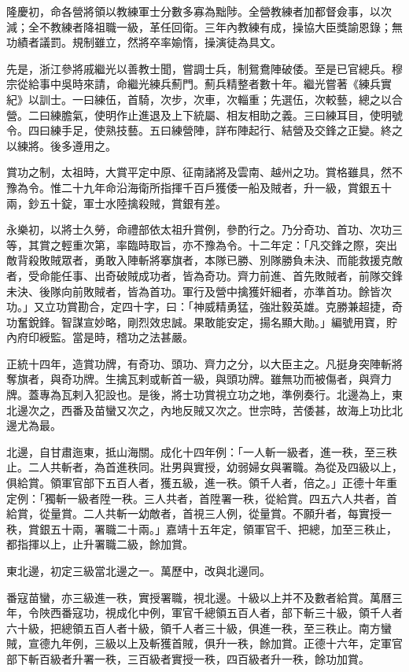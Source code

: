 隆慶初，命各營將領以教練軍士分數多寡為黜陟。全營教練者加都督僉事，以次減；全不教練者降祖職一級，革任回衛。三年內教練有成，操協大臣獎諭恩錄；無功績者議罰。規制雖立，然將卒率媮惰，操演徒為具文。

先是，浙江參將戚繼光以善教士聞，嘗調士兵，制鴛鴦陣破倭。至是已官總兵。穆宗從給事中吳時來請，命繼光練兵薊門。薊兵精整者數十年。繼光嘗著《練兵實紀》以訓士。一曰練伍，首騎，次步，次車，次輜重；先選伍，次較藝，總之以合營。二曰練膽氣，使明作止進退及上下統屬、相友相助之義。三曰練耳目，使明號令。四曰練手足，使熟技藝。五曰練營陣，詳布陣起行、結營及交鋒之正變。終之以練將。後多遵用之。

賞功之制，太祖時，大賞平定中原、征南諸將及雲南、越州之功。賞格雖具，然不豫為令。惟二十九年命沿海衛所指揮千百戶獲倭一船及賊者，升一級，賞銀五十兩，鈔五十錠，軍士水陸擒殺賊，賞銀有差。

永樂初，以將士久勞，命禮部依太祖升賞例，參酌行之。乃分奇功、首功、次功三等，其賞之輕重次第，率臨時取旨，亦不豫為令。十二年定：「凡交鋒之際，突出敵背殺敗賊眾者，勇敢入陣斬將搴旗者，本隊已勝、別隊勝負未決、而能救援克敵者，受命能任事、出奇破賊成功者，皆為奇功。齊力前進、首先敗賊者，前隊交鋒未決、後隊向前敗賊者，皆為首功。軍行及營中擒獲奸細者，亦準首功。餘皆次功。」又立功賞勘合，定四十字，曰：「神威精勇猛，強壯毅英雄。克勝兼超捷，奇功奮銳鋒。智謀宣妙略，剛烈效忠誠。果敢能安定，揚名顯大勛。」編號用寶，貯內府印綬監。當是時，稽功之法甚嚴。

正統十四年，造賞功牌，有奇功、頭功、齊力之分，以大臣主之。凡挺身突陣斬將奪旗者，與奇功牌。生擒瓦剌或斬首一級，與頭功牌。雖無功而被傷者，與齊力牌。蓋專為瓦剌入犯設也。是後，將士功賞視立功之地，準例奏行。北邊為上，東北邊次之，西番及苗蠻又次之，內地反賊又次之。世宗時，苦倭甚，故海上功比北邊尤為最。

北邊，自甘肅迤東，抵山海關。成化十四年例：「一人斬一級者，進一秩，至三秩止。二人共斬者，為首進秩同。壯男與實授，幼弱婦女與署職。為從及四級以上，俱給賞。領軍官部下五百人者，獲五級，進一秩。領千人者，倍之。」正德十年重定例：「獨斬一級者陞一秩。三人共者，首陞署一秩，從給賞。四五六人共者，首給賞，從量賞。二人共斬一幼敵者，首視三人例，從量賞。不願升者，每實授一秩，賞銀五十兩，署職二十兩。」嘉靖十五年定，領軍官千、把總，加至三秩止，都指揮以上，止升署職二級，餘加賞。

東北邊，初定三級當北邊之一。萬歷中，改與北邊同。

番寇苗蠻，亦三級進一秩，實授署職，視北邊。十級以上并不及數者給賞。萬曆三年，令陜西番寇功，視成化中例，軍官千總領五百人者，部下斬三十級，領千人者六十級，把總領五百人者十級，領千人者三十級，俱進一秩，至三秩止。南方蠻賊，宣德九年例，三級以上及斬獲首賊，俱升一秩，餘加賞。正德十六年，定軍官部下斬百級者升署一秩，三百級者實授一秩，四百級者升一秩，餘功加賞。

